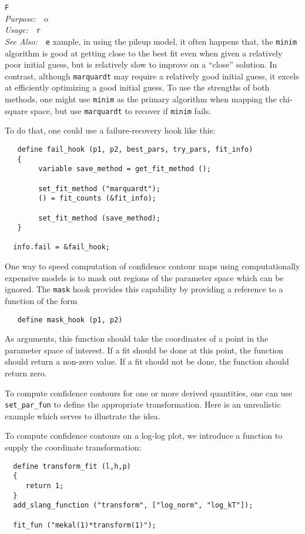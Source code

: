 \documentclass{book}
\makeatletter
\newif\ifpdf
\newenvironment{isisfunction}[4]%
{\index{{#1}@{\tt #1}}%
  \ifpdf
  \else
     \addcontentsline{toc}{subsection}{{#1} -- {#2}}
  \fi
  \vbox{
          \vspace*{\baselineskip}
          {\LARGE\tt #1}\vspace*{\baselineskip}\\
          {{\it Purpose:}~~{#2}}\\
          {{\it Usage:}~~{\tt #3}}\\
          {{\it See Also:}~~{\tt #4}}
       }
}%
{ }
\makeatother
\begin{document}
\begin{isisfunction}
For example, in using the pileup model, it often happens that, the
\verb|minim| algorithm is good at getting close to the best fit
even when given a relatively poor initial guess, but is relatively
slow to improve on a ``close'' solution. In contrast, although
\verb|marquardt| may require a relatively good initial guess, it
excels at efficiently optimizing a good initial guess. To use the
strengths of both methods, one might use \verb|minim| as the
primary algorithm when mapping the chi-square space, but use
\verb|marquardt| to recover if \verb|minim| fails.

To do that, one could use a failure-recovery hook like this:
\begin{verbatim}
   define fail_hook (p1, p2, best_pars, try_pars, fit_info)
   {
        variable save_method = get_fit_method ();

        set_fit_method ("marquardt");
        () = fit_counts (&fit_info);

        set_fit_method (save_method);
   }

  info.fail = &fail_hook;
\end{verbatim}

One way to speed computation of confidence contour maps
using computationally expensive models is to mask out
regions of the parameter space which can be ignored.
The \verb|mask| hook provides this capability by providing
a reference to a function of the form
\begin{verbatim}
   define mask_hook (p1, p2)
\end{verbatim}
As arguments, this function should take the coordinates
of a point in the parameter space of interest.  If
a fit should be done at this point, the function should
return a non-zero value.  If a fit should not be done,
the function should return zero.

To compute confidence contours for one or more derived quantities,
one can use \verb|set_par_fun| to define the appropriate
transformation.  Here is an unrealistic example which serves to
illustrate the idea.

To compute confidence contours on a log-log plot, we
introduce a function to supply the coordinate transformation:
\begin{verbatim}
  define transform_fit (l,h,p)
  {
     return 1;
  }
  add_slang_function ("transform", ["log_norm", "log_kT"]);

  fit_fun ("mekal(1)*transform(1)");


\end{verbatim}
\end{isisfunction}
\end{document}
